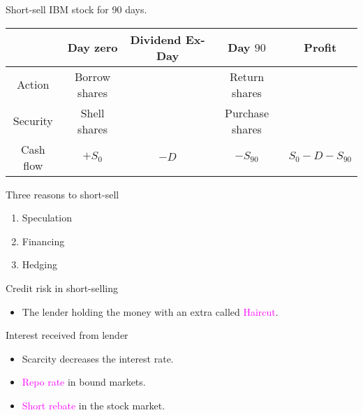 \begin{frame}[fragile,t]
\begin{myexample}
	Short-sell IBM stock for 90 days. \\
	\bigskip
\begin{center}
	\renewcommand{\arraystretch}{1.2}
	\begin{tabular}{|c|c|c|c| c|}
		\hline
             & Day zero      & Dividend Ex-Day & Day $90$        & Profit          \\ \hline
   Action    & Borrow shares &                 & Return shares   &                 \\
   Security  & Shell shares  &                 & Purchase shares &                 \\
	 Cash flow & $+S_0$        & $-D$            & $-S_{90}$       & $ S_0-D-S_{90}$ \\ \hline
	\end{tabular}
\end{center}
\end{myexample}
\end{frame}
\begin{frame}[fragile,t]
Three reasons to short-sell
\begin{enumerate}
	\item Speculation
	\item Financing
	\item Hedging
\end{enumerate}

\bigskip
\mySeparateLine
\bigskip

Credit risk in short-selling
\begin{itemize}
	\item The lender holding the money with an extra called \textcolor{magenta}{Haircut}.
\end{itemize}
\bigskip

Interest received from lender
\begin{itemize}
	\item Scarcity decreases the interest rate.
	\item \textcolor{magenta}{Repo rate} in bound markets.
	\item \textcolor{magenta}{Short rebate} in the stock market.
\end{itemize}
\end{frame}
